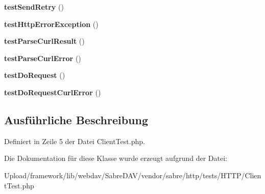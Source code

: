 \begin{DoxyCompactItemize}
{\bfseries test\+Send\+Retry} ()
\item 
\mbox{\label{class_sabre_1_1_h_t_t_p_1_1_client_test_a2f1e587bfca502d4ad583141960769a0}} 
{\bfseries test\+Http\+Error\+Exception} ()
\item 
\mbox{\label{class_sabre_1_1_h_t_t_p_1_1_client_test_a51f7be7f32cd486182282c0f4b6e4ec3}} 
{\bfseries test\+Parse\+Curl\+Result} ()
\item 
\mbox{\label{class_sabre_1_1_h_t_t_p_1_1_client_test_aedb4482630f31ad36e45e7017c174858}} 
{\bfseries test\+Parse\+Curl\+Error} ()
\item 
\mbox{\label{class_sabre_1_1_h_t_t_p_1_1_client_test_afa4346dc0713c7b771f833e749a31bd6}} 
{\bfseries test\+Do\+Request} ()
\item 
\mbox{\label{class_sabre_1_1_h_t_t_p_1_1_client_test_aca10aa44f31c1ef3a898ea1b8377b0bd}} 
{\bfseries test\+Do\+Request\+Curl\+Error} ()
\end{DoxyCompactItemize}


\subsection{Ausführliche Beschreibung}


Definiert in Zeile 5 der Datei Client\+Test.\+php.



Die Dokumentation für diese Klasse wurde erzeugt aufgrund der Datei\+:\begin{DoxyCompactItemize}
\item 
Upload/framework/lib/webdav/\+Sabre\+D\+A\+V/vendor/sabre/http/tests/\+H\+T\+T\+P/Client\+Test.\+php\end{DoxyCompactItemize}
